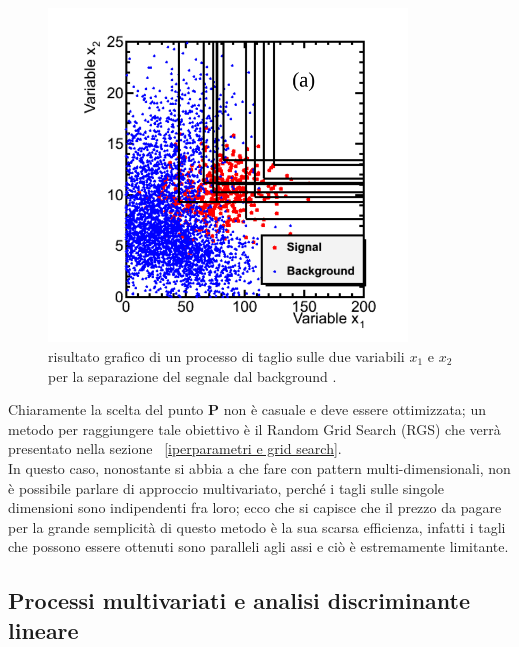 \begin{figure}[h!]
	\centering
	\includegraphics[width=0.85\textwidth]{figs/Grid_example.png}
	\caption{risultato grafico di un processo di taglio sulle due variabili $x_1$ e $x_2$ per la separazione del segnale dal background \cite{Metodi_multivariati}.}
	\label{fig:grid_example}
\end{figure}

Chiaramente la scelta del punto $\textbf{P}$ non è casuale e deve essere ottimizzata; un metodo per raggiungere tale obiettivo è il Random Grid Search (RGS) che verrà presentato nella sezione ~\ref{iperparametri e grid search}. \\
In questo caso, nonostante si abbia a che fare con pattern multi-dimensionali, non è possibile parlare di approccio multivariato, perché i tagli sulle singole dimensioni sono indipendenti fra loro; ecco che si capisce che il prezzo da pagare per la grande semplicità di questo metodo è la sua scarsa efficienza, infatti i tagli che possono essere ottenuti sono paralleli agli assi e ciò è estremamente limitante.

\newpage

\subsection{Processi multivariati e analisi discriminante lineare}
\label{metodi lineari e discriminante di Fisher}

